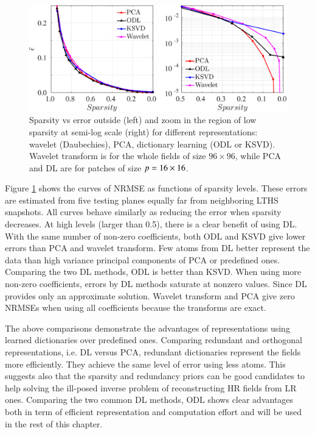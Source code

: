 \begin{figure}[t]
\centering
	\includegraphics[width=\textwidth]{./images/DL/DLstat/Sparsity_vs_NRMSE_PCA_ODL_KSVD_WL_Dau_patchsize04.eps}
	\caption{\label{fig:Sparsity_vs_NRMSE} Sparsity vs error outside (left) and zoom in the region of low sparsity at semi-log scale (right) for different representations: wavelet (Daubechies), PCA, dictionary learning (ODL or KSVD). Wavelet transform is for the whole fields of size $ 96 \times 96$, while PCA and DL are for patches of size $ p = 16 \times 16 $.}
\end{figure}

Figure \ref{fig:Sparsity_vs_NRMSE} shows the curves of NRMSE as functions of sparsity levels. These errors are estimated from five testing planes equally far from neighboring LTHS snapshots. All curves behave similarly as reducing the error when sparsity decreases. At high levels (larger than 0.5), there is a clear benefit of using DL. With the same number of non-zero coefficients, both ODL and KSVD give lower errors than PCA and wavelet transform. Few atoms from DL better represent the data than high variance principal components of PCA or predefined ones. Comparing the two DL methods, ODL is better than KSVD. When using more non-zero coefficients, errors by DL methods saturate at nonzero values. Since DL provides only an approximate solution. Wavelet transform and PCA give zero NRMSEs when using all coefficients because the transforms are exact.

The above comparisons demonstrate the advantages of representations using learned dictionaries over predefined ones. Comparing redundant and orthogonal representations, i.e. DL versus PCA, redundant dictionaries represent the fields more efficiently. They achieve the same level of error using less atoms. This suggests also that the sparsity and redundancy priors can be good candidates to help solving the ill-posed inverse problem of reconstructing HR fields from LR ones. Comparing the two common DL methods, ODL shows clear advantages both in term of efficient representation and computation effort and will be used in the rest of this chapter. 
 	
